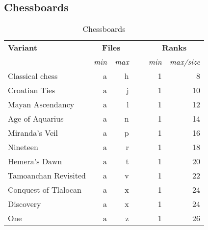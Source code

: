 \subsection*{Chessboards}
\label{sec:Appendix/Introduction/Chessboards}

\begin{table}[!h]
\centering
\begin{tabular}{ lrrcrr }
\toprule
\textbf{Variant}      & \multicolumn{2}{c}{ \textbf{Files} } & ~ & \multicolumn{2}{c}{ \textbf{Ranks} }   \\ \cmidrule{2-3} \cmidrule{5-6}
                      & \emph{min} & \emph{max}              &   & \emph{min} & \emph{max/size}           \\
\midrule
Classical chess       & a          & h                       &   & 1          &  8                        \\ %
Croatian Ties         & a          & j                       &   & 1          & 10                        \\
Mayan Ascendancy      & a          & l                       &   & 1          & 12                        \\
Age of Aquarius       & a          & n                       &   & 1          & 14                        \\
Miranda's Veil        & a          & p                       &   & 1          & 16                        \\
Nineteen              & a          & r                       &   & 1          & 18                        \\
Hemera's Dawn         & a          & t                       &   & 1          & 20                        \\
Tamoanchan Revisited  & a          & v                       &   & 1          & 22                        \\
Conquest of Tlalocan  & a          & x                       &   & 1          & 24                        \\
Discovery             & a          & x                       &   & 1          & 24                        \\
One                   & a          & z                       &   & 1          & 26                        \\
\bottomrule
\end{tabular}
\caption{Chessboards}
\label{tbl:Appendix/Introduction/Chessboards}
\end{table}


